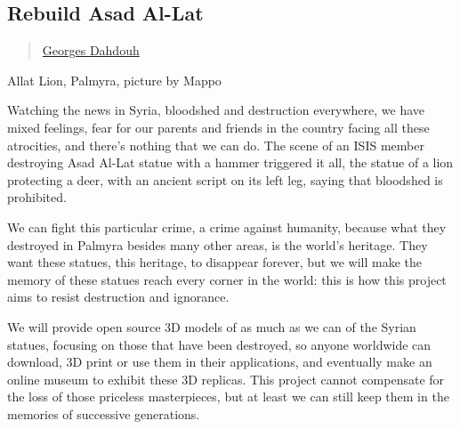 \subsection{Rebuild Asad Al-Lat}\label{rebuild-asad-al-lat}

\begin{quote}
\hyperlink{georges-dahdouh}{Georges Dahdouh}
\end{quote}

Allat Lion, Palmyra, picture by Mappo

Watching the news in Syria, bloodshed and destruction everywhere, we
have mixed feelings, fear for our parents and friends in the country
facing all these atrocities, and there's nothing that we can do. The
scene of an ISIS member destroying Asad Al-Lat statue with a hammer
triggered it all, the statue of a lion protecting a deer, with an
ancient script on its left leg, saying that bloodshed is prohibited.

We can fight this particular crime, a crime against humanity, because
what they destroyed in Palmyra besides many other areas, is the world's
heritage. They want these statues, this heritage, to disappear forever,
but we will make the memory of these statues reach every corner in the
world: this is how this project aims to resist destruction and
ignorance.

We will provide open source 3D models of as much as we can of the Syrian
statues, focusing on those that have been destroyed, so anyone worldwide
can download, 3D print or use them in their applications, and eventually
make an online museum to exhibit these 3D replicas. This project cannot
compensate for the loss of those priceless masterpieces, but at least we
can still keep them in the memories of successive generations.
